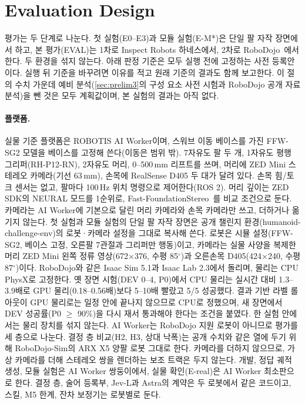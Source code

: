 \section{Evaluation Design}
\label{sec:experiments}

평가는 두 단계로 나눈다. 첫 실험(E0--E3)과 모듈 실험(E-M*)은 단일 팔 자작 장면에서 하고, 본 평가(EVAL)는 1차로 Inspect Robots 하네스에서, 2차로 RoboDojo~\cite{robodojobench2026}에서 한다. 두 환경을 섞지 않는다. 아래 판정 기준은 모두 실행 전에 고정하는 사전 등록안이다. 실행 뒤 기준을 바꾸려면 이유를 적고 원래 기준의 결과도 함께 보고한다. 이 절의 수치 가운데 예비 분석(\cref{sec:prelim3}의 구성 요소 사전 시험과 RoboDojo 공개 자료 분석)을 뺀 것은 모두 계획값이며, 본 실험의 결과는 아직 없다.

\paragraph{플랫폼.}
실물 기준 플랫폼은 ROBOTIS AI Worker이며, 스워브 이동 베이스를 가진 FFW-SG2 모델을 베이스를 고정해 쓴다(이동은 범위 밖). 7자유도 팔 두 개, 1자유도 평행 그리퍼(RH-P12-RN), 2자유도 머리, 0--500\,mm 리프트를 쓰며, 머리에 ZED Mini 스테레오 카메라(기선 63\,mm), 손목에 RealSense D405 두 대가 달려 있다. 손목 힘/토크 센서는 없고, 팔마다 100\,Hz 위치 명령으로 제어한다(ROS 2). 머리 깊이는 ZED SDK의 NEURAL 모드를 1순위로, Fast-FoundationStereo~\cite{fastfs2025}를 비교 조건으로 둔다. 카메라는 AI Worker에 기본으로 달린 머리 카메라와 손목 카메라만 쓰고, 더하거나 옮기지 않는다. 첫 실험과 모듈 실험의 단일 팔 자작 장면은 공개 챌린지 환경(humanoid-challenge-env)의 로봇·카메라 설정을 그대로 복사해 쓴다. 로봇은 시뮬 설정(FFW-SG2, 베이스 고정, 오른팔 7관절과 그리퍼만 행동)이고, 카메라는 실물 사양을 복제한 머리 ZED Mini 왼쪽 정류 영상(672$\times$376, 수평 85$^\circ$)과 오른손목 D405(424$\times$240, 수평 87$^\circ$)이다. RoboDojo와 같은 Isaac Sim 5.1과 Isaac Lab 2.3에서 돌리며, 물리는 CPU PhysX로 고정한다. 옛 장면 시험(DEV 0--4, P0)에서 CPU 물리는 실시간 대비 1.3--3.9배로 GPU 물리(0.18--0.56배)보다 5--10배 빨랐고 5/5 성공했다. 결과 기반 라벨 롤아웃이 GPU 물리로는 일정 안에 끝나지 않으므로 CPU로 정했으며, 새 장면에서 DEV 성공률(P0 $\ge$ 90\%)을 다시 재서 통과해야 한다는 조건을 붙였다. 한 실험 안에서는 물리 장치를 섞지 않는다. AI Worker는 RoboDojo 지원 로봇이 아니므로 평가를 세 층으로 나눈다. 결정 층 비교(H2, H3, 상대 낙폭)는 공개 수치와 같은 열에 두기 위해 RoboDojo-Sim의 ARX X5 양팔 로봇 그대로 한다. 카메라를 더하지 않으므로, 가상 카메라를 더해 스테레오 쌍을 렌더하는 보조 트랙은 두지 않는다. 개발, 정답 궤적 생성, 모듈 실험은 AI Worker 쌍둥이에서, 실물 확인(E-real)은 AI Worker 최소판으로 한다. 결정 층, 술어 등록부, Jev-L과 Astra의 계약은 두 로봇에서 같은 코드이고, 스킬, M5 한계, 잔차 보정기는 로봇별로 둔다.

